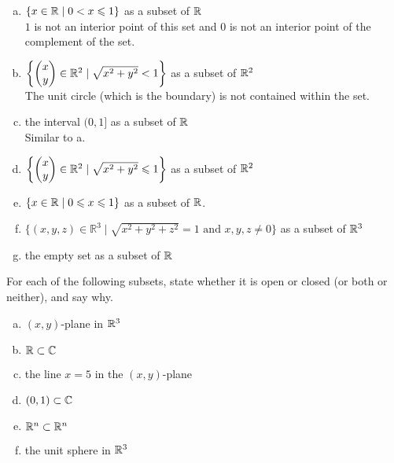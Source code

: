 \begin{enumerate}[a.]
	\item $\left\{ x\in \mathbb{R} \mid 0<x \leqslant 1 \right\}$ as a subset of $\mathbb{R}$ \\
	\answer {} $1$ is not an interior point of this set and $0$ is not an interior point of the complement of the set.
	\item $\left\{ \begin{pmatrix} x \\ y \end{pmatrix}\in \mathbb{R}^2 \mid \sqrt{x^2+y^2}< 1 \right\}$ as a subset of $\mathbb{R}^2$ \\
	\answer {} The unit circle (which is the boundary) is not contained within the set.
	\item the interval $(0,1]$ as a subset of $\mathbb{R}$ \\
	\answer {} Similar to a.
	\item $\left\{ \begin{pmatrix} x \\ y \end{pmatrix}\in \mathbb{R}^2 \mid \sqrt{x^2+y^2}\leqslant 1 \right\}$ as a subset of $\mathbb{R}^2$ \\
	\item $\{x\in\mathbb{R}\mid 0\leqslant x\leqslant 1\}$ as a subset of $\mathbb{R}$.
	\item $\{(x,y,z)\in\mathbb R^3 \mid \sqrt{x^2+y^2+z^2}=1 \text{ and }x,y,z\neq 0\}$ as a subset of $\mathbb{R}^3$
  \item the empty set as a subset of $\mathbb{R}$

\end{enumerate}


For each of the following subsets, state whether it is open or closed (or both or neither), and say why.
\begin{enumerate}[a.]
\item $(x,y)$-plane in $\mathbb{R}^3$
\item $\mathbb{R}\subset \mathbb{C}$
\item the line $x=5$ in the $(x,y)$-plane
\item $(0,1)\subset \mathbb{C}$
\item $\mathbb{R}^n\subset \mathbb{R}^n$
\item the unit sphere in $\mathbb{R}^3$
\end{enumerate}

